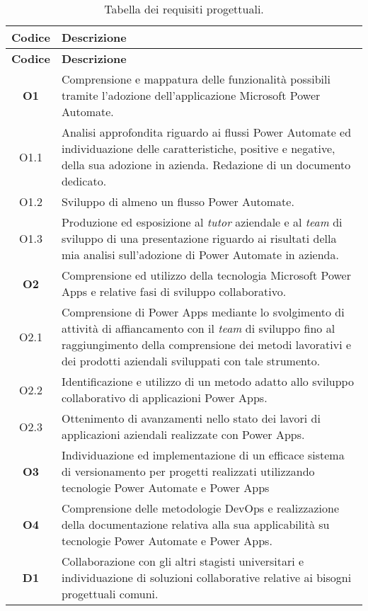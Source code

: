 \begin{longtable}{|c|p{11cm}|}
\caption{Tabella dei requisiti progettuali.}
\label{tab:obiettiviProgettuali}\\
\hline \textbf{Codice} & \textbf{Descrizione}\\ \hline \endfirsthead
\hline \textbf{Codice} & \textbf{Descrizione}\\ \hline \endhead
\hline \endfoot
\hline \endlastfoot
\textbf{O1}    & Comprensione e mappatura delle funzionalità possibili tramite l'adozione dell'applicazione Microsoft Power Automate.\\
\hline O1.1  & Analisi approfondita riguardo ai flussi Power Automate ed individuazione delle caratteristiche, positive e negative, della sua adozione in azienda. Redazione di un documento dedicato.\\
\hline O1.2  & Sviluppo di almeno un flusso Power Automate.\\
\hline O1.3  & Produzione ed esposizione al \emph{tutor} aziendale e al \emph{team} di sviluppo di una presentazione riguardo ai risultati della mia analisi sull'adozione di Power Automate in azienda.\\
\hline \textbf{O2}  & Comprensione ed utilizzo della tecnologia Microsoft Power Apps e relative fasi di sviluppo collaborativo.\\
\hline O2.1  & Comprensione di Power Apps mediante lo svolgimento di attività di affiancamento con il \emph{team} di sviluppo fino al raggiungimento della comprensione dei metodi lavorativi e dei prodotti aziendali sviluppati con tale strumento.\\
\hline O2.2  & Identificazione e utilizzo di un metodo adatto allo sviluppo collaborativo di applicazioni Power Apps.\\
\hline O2.3  & Ottenimento di avanzamenti nello stato dei lavori di applicazioni aziendali realizzate con Power Apps.\\
\hline \textbf{O3}  & Individuazione ed implementazione di un efficace sistema di versionamento per progetti realizzati utilizzando tecnologie Power Automate e Power Apps\\
\hline \textbf{O4}  & Comprensione delle metodologie \gls{DevOps} e realizzazione della documentazione relativa alla sua applicabilità su tecnologie Power Automate e Power Apps.\\
\hline 
\hline \textbf{D1}  & Collaborazione con gli altri stagisti universitari e individuazione di soluzioni collaborative relative ai bisogni progettuali comuni.\\

\end{longtable}

